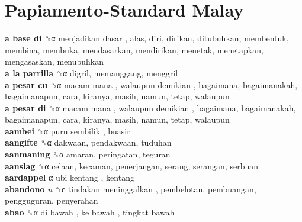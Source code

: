 \twocolumn
\chapter{Papiamento-Standard Malay}
\small
\raggedright
{}\textbf{a base di} ␝α   menjadikan dasar , alas, diri, dirikan, ditubuhkan, membentuk, membina, membuka, mendasarkan, mendirikan, menetak, menetapkan, mengasaskan, menubuhkan  \\
\textbf{a la parrilla} ␝α  digril, memanggang, menggril  \\
\textbf{a pesar cu} ␝α   macam mana ,  walaupun demikian , bagaimana, bagaimanakah, bagaimanapun, cara, kiranya, masih, namun, tetap, walaupun  \\
\textbf{a pesar di} ␝α   macam mana ,  walaupun demikian , bagaimana, bagaimanakah, bagaimanapun, cara, kiranya, masih, namun, tetap, walaupun  \\
\textbf{aambei} ␝α   puru sembilik , buasir  \\
\textbf{aangifte} ␝α  dakwaan, pendakwaan, tuduhan  \\
\textbf{aanmaning} ␝α  amaran, peringatan, teguran  \\
\textbf{aanslag} ␝α  celaan, kecaman, penerjangan, serang, serangan, serbuan  \\
\textbf{aardappel} α   ubi kentang , kentang  \\
\textbf{abandono} \emph{n}  ␝ϲ   tindakan meninggalkan , pembelotan, pembuangan, pengguguran, penyerahan  \\
\textbf{abao} ␝α   di bawah ,  ke bawah ,  tingkat bawah   \\
